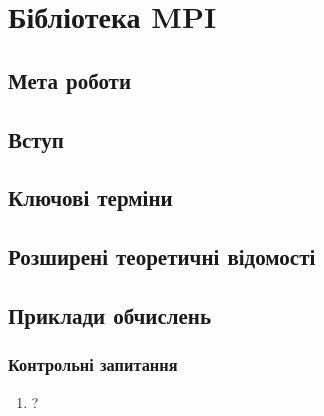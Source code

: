 \chapter{Бібліотека MPI}
\nopagebreak[4]
\section*{Мета роботи}

\nopagebreak[4]
\section{Вступ}
\nopagebreak[4]


\section{Ключові терміни}
\nopagebreak[4]




\section{Розширені теоретичні відомості}
\nopagebreak[4]




\section{Приклади обчислень}
\nopagebreak[4]




\subsection*{Контрольні запитання}
\nopagebreak[4]
\begin{enumerate}
\item ?
\end{enumerate}



